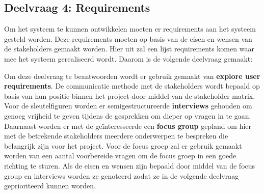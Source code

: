 \subsection{Deelvraag 4: Requirements}
Om het systeem te kunnen ontwikkelen moeten er requirements aan het systeem gesteld worden.
Deze requirements moeten op basis van de eisen en wensen van de stakeholders gemaakt worden.
Hier uit zal een lijst requirements komen waar mee het systeem gerealiseerd wordt.
Daarom is de volgende deelvraag gemaakt:

\begin{center}
 \textit{\SubquestionFour}
\end{center}

\whitespace[0.2]
Om deze deelvraag te beantwoorden wordt er gebruik gemaakt van \textbf{explore user requirements}.
De communicatie methode met de stakeholders wordt bepaald op basis van hun positie binnen het project door middel van de stakeholder matrix.
Voor de sleutelfiguren worden er semigestructureerde \textbf{interviews} gehouden om genoeg vrijheid te geven tijdens de gesprekken om dieper op vragen in te gaan.
Daarnaast worden er met de geïnteresseerde een \textbf{focus group} gepland om hier met de betrekende stakeholders meerdere onderwerpen te bespreken die belangrijk zijn voor het project.
Voor de focus groep zal er gebruik gemaakt worden van een aantal voorbereide vragen om de focus groep in een goede richting te sturen.
Als de eisen en wensen zijn bepaald door middel van de focus group en interviews worden ze genoteerd zodat ze in de volgende deelvraag geprioriteerd kunnen worden.
